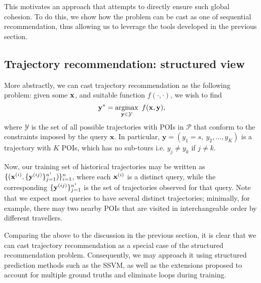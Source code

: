 This motivates an approach that attempts to directly ensure such global cohesion.
To do this, we show how the problem can be cast as one of sequential recommendation, 
thus allowing us to leverage the tools developed in the previous section.


%
\subsection{Trajectory recommendation: structured view}

More abstractly, we can cast trajectory recommendation as the following problem:
given some $\mathbf{x}$, and suitable function $f(\cdot,\cdot)$, we wish to find
\begin{equation*}
\mathbf{y}^* = \operatorname*{argmax}_{\mathbf{y} \in \mathcal{Y}}~f(\mathbf{x}, \mathbf{y}),
\end{equation*}
where $\mathcal{Y}$ is the set of all possible trajectories with POIs in $\mathcal{P}$ that conform to the constraints imposed by the query $\mathbf{x}$.
In particular,
$\mathbf{y} = (y_1 = s,~ y_2, \dots, y_K)$ is a trajectory with $K$ POIs, which has no sub-tours i.e. $y_j \ne y_k$ if $j \ne k$.

Now, our training set of historical trajectories may be written as
$\{ ( \mathbf{x}^{({i})}, \{ \mathbf{y}^{({ij})} \}_{j=1}^{n^i} ) \}_{i=1}^{n}$,
where each $\mathbf{x}^{({i})}$ is a distinct query,
while the corresponding $\{ \mathbf{y}^{({ij})} \}_{j=1}^{n^i}$ is the set of trajectories observed for that query.
Note that we expect most queries to have several distinct trajectories;
minimally,
for example,
there may two nearby POIs that are visited in interchangeable order by different travellers.

Comparing the above to the discussion in the previous section, it is clear that
we can cast trajectory recommendation as a special case of the structured recommendation problem.
Consequently, we may approach it using structured prediction methods such as the SSVM,
as well as the extensions proposed to account for multiple ground truths and eliminate loops during training.

%

%

